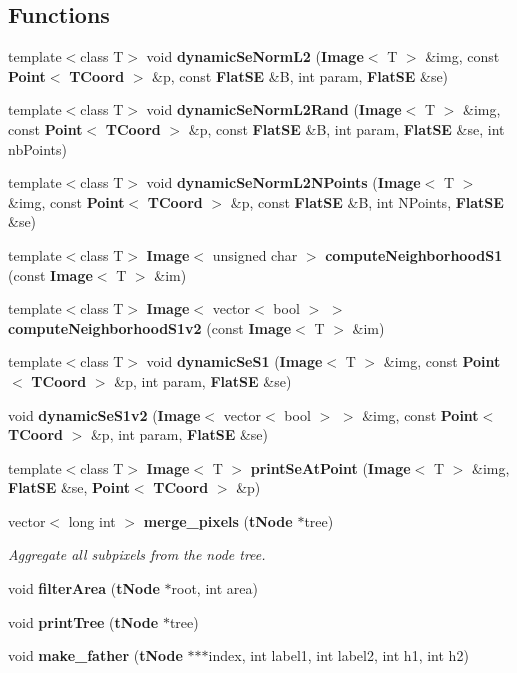 \subsection*{Functions}
\begin{CompactItemize}
\item 
template$<$class T$>$ void {\bf dynamic\-Se\-Norm\-L2} ({\bf Image}$<$ T $>$ \&img, const {\bf Point}$<$ {\bf TCoord} $>$ \&p, const {\bf Flat\-SE} \&B, int param, {\bf Flat\-SE} \&se)
\item 
template$<$class T$>$ void {\bf dynamic\-Se\-Norm\-L2Rand} ({\bf Image}$<$ T $>$ \&img, const {\bf Point}$<$ {\bf TCoord} $>$ \&p, const {\bf Flat\-SE} \&B, int param, {\bf Flat\-SE} \&se, int nb\-Points)
\item 
template$<$class T$>$ void {\bf dynamic\-Se\-Norm\-L2NPoints} ({\bf Image}$<$ T $>$ \&img, const {\bf Point}$<$ {\bf TCoord} $>$ \&p, const {\bf Flat\-SE} \&B, int NPoints, {\bf Flat\-SE} \&se)
\item 
template$<$class T$>$ {\bf Image}$<$ unsigned char $>$ {\bf compute\-Neighborhood\-S1} (const {\bf Image}$<$ T $>$ \&im)
\item 
template$<$class T$>$ {\bf Image}$<$ vector$<$ bool $>$ $>$ {\bf compute\-Neighborhood\-S1v2} (const {\bf Image}$<$ T $>$ \&im)
\item 
template$<$class T$>$ void {\bf dynamic\-Se\-S1} ({\bf Image}$<$ T $>$ \&img, const {\bf Point}$<$ {\bf TCoord} $>$ \&p, int param, {\bf Flat\-SE} \&se)
\item 
void {\bf dynamic\-Se\-S1v2} ({\bf Image}$<$ vector$<$ bool $>$ $>$ \&img, const {\bf Point}$<$ {\bf TCoord} $>$ \&p, int param, {\bf Flat\-SE} \&se)
\item 
template$<$class T$>$ {\bf Image}$<$ T $>$ {\bf print\-Se\-At\-Point} ({\bf Image}$<$ T $>$ \&img, {\bf Flat\-SE} \&se, {\bf Point}$<$ {\bf TCoord} $>$ \&p)
\item 
vector$<$ long int $>$ {\bf merge\_\-pixels} ({\bf t\-Node} $\ast$tree)
\begin{CompactList}\small\item\em Aggregate all subpixels from the node tree. \item\end{CompactList}\item 
void {\bf filter\-Area} ({\bf t\-Node} $\ast$root, int area)
\item 
void {\bf print\-Tree} ({\bf t\-Node} $\ast$tree)
\item 
void {\bf make\_\-father} ({\bf t\-Node} $\ast$$\ast$$\ast$index, int label1, int label2, int h1, int h2)

\end{CompactItemize}
